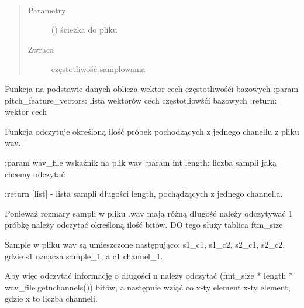 \documentclass[letterpaper,10pt,polish]{sphinxmanual}
\begin{document}

\begin{fulllineitems}
\label{\detokenize{voice_module:voice_module.get_sample_rate}}~\begin{quote}\begin{description}
\item[{Parametry}] \leavevmode
{} () \textendash{} ścieżka do pliku

\item[{Zwraca}] \leavevmode
częstotliwość samplowania

\end{description}\end{quote}

\end{fulllineitems}


\begin{fulllineitems}
\label{\detokenize{voice_module:voice_module.get_summary_pitch_feature_vector}}
Funkcja na podstawie danych oblicza wektor cech częstotliwośći bazowych
:param pitch\_feature\_vectors: lista wektorów cech częstotliowśći bazowych
:return: wektor cech

\end{fulllineitems}


\begin{fulllineitems}
\label{\detokenize{voice_module:voice_module.read_from_wav_file}}
Funkcja odczytuje określoną ilość próbek pochodzących z jednego chanellu z pliku wav.

:param wav\_file wskaźnik na plik wav
:param int length: liczba sampli jaką chcemy odczytać

:return {[}list{]} - lista sampli długości length, pochądzących z jednego channella.

Ponieważ rozmary sampli w pliku .wav mają różną długość należy odczytywać 1 próbkę należy odczytać określoną ilość bitów.
DO tego służy tablica ftm\_size

Sample w pliku wav są umieszczone następująco: s1\_c1, s1\_c2, s2\_c1, s2\_c2, gdzie s1 oznacza sample\_1, a c1 channel\_1.

Aby więc odczytać informację o długości n należy odczytać (fmt\_size * length * wav\_file.getnchannels()) bitów, a
następnie wziąć co x-ty element x-ty element, gdzie x to liczba channeli.

\end{fulllineitems}
\end{document}
